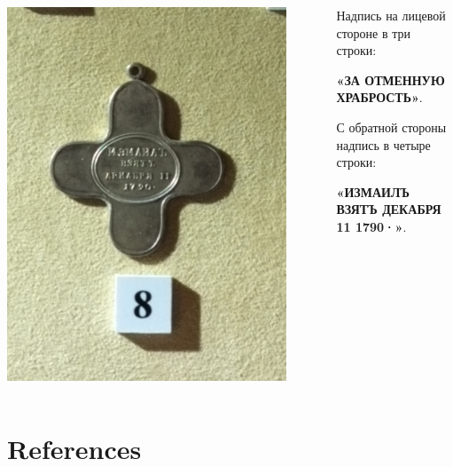 \begin{frame}{}
	\begin{columns}
		\begin{column}{0.45\textwidth}
			\includegraphics[width=0.9\textwidth]{medal3.jpg}
		\end{column}
		\begin{column}{0.45\textwidth}

			Надпись на лицевой стороне в три строки:

			\textbf{«ЗА ОТМЕННУЮ ХРАБРОСТЬ»}.

			С обратной стороны надпись в четыре строки:

			\textbf{«ИЗМАИЛЪ ВЗЯТЪ ДЕКАБРЯ 11 1790·»}.

		\end{column}
	\end{columns}
\end{frame}

\section{References}

